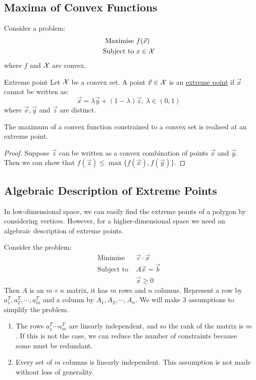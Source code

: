 \documentclass[../Main.tex]{subfiles}
\begin{document}
\subsection{Maxima of Convex Functions}
Consider a problem:
\begin{align*}
    \text{Maximise } &f(\vec{x}) \\
    \text{Subject to } &x \in \mathcal{X}
\end{align*}
where $f$ and $\mathcal{X}$ are convex.
\begin{definition}{Extreme point}
    Let $\mathcal{X}$ be a convex set. A point $\vec{x} \in \mathcal{X}$ is an \underline{extreme point} if $\vec{x}$ cannot be written as:
    \begin{equation*}
        \vec{x} = \lambda \vec{y} + (1-\lambda) \vec{z},~\lambda \in (0, 1)
    \end{equation*}
    where $\vec{x}, \vec{y}$ and $\vec{z}$ are distinct.
\end{definition}
\begin{theorem}
    The maximum of a convex function constrained to a convex set is realised at an extreme point.
\end{theorem}
\begin{proof}
    Suppose $\vec{z}$ can be written as a convex combination of points $\vec{x}$ and $\vec{y}$. Then we can show that $f(\vec{z}) \leq \max\{f(\vec{x}), f(\vec{y})\}$.
\end{proof}
\subsection{Algebraic Description of Extreme Points}
In low-dimensional space, we can easily find the extreme points of a polygon by considering vertices. However, for a higher-dimensional space we need an algebraic description of extreme points.

Consider the problem:
\begin{align*}
    \text{Minimise }& \vec{c} \cdot \vec{x} \\
    \text{Subject to }& A\vec{x} = \vec{b} \\
    & \vec{x} \geq 0
\end{align*}
Then $A$ is an $m \times n$ matrix, it has $m$ rows and $n$ columns. Represent a row by $a_1^T, a_2^T, \cdots, a_m^T$ and a column by $A_1, A_2, \cdots, A_n$. We will make 3 assumptions to simplify the problem.
\begin{enumerate}
    \item The rows $a_1^T \cdots a_m^T$ are linearly independent, and so the rank of the matrix is $m$. If this is not the case, we can reduce the number of constraints because some must be redundant.
    \item Every set of $m$ columns is linearly independent. This assumption is not made without loss of generality.
\end{enumerate}
\end{document}
